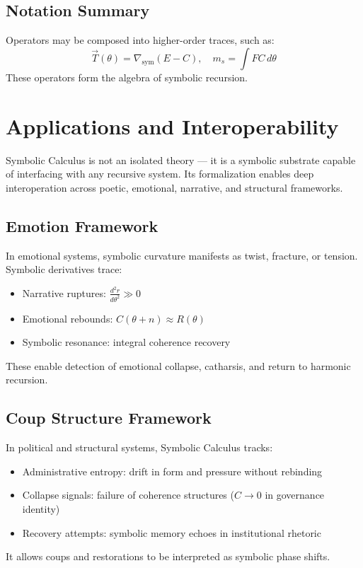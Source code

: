 \documentclass[12pt]{article}
\begin{document}
\subsection*{Notation Summary}
Operators may be composed into higher-order traces, such as:
\[ \vec{T}(\theta) = \nabla_{\text{sym}} (E - C), \quad m_s = \int F C \, d\theta \]
These operators form the algebra of symbolic recursion.

\section{Applications and Interoperability}

Symbolic Calculus is not an isolated theory — it is a symbolic substrate capable of interfacing with any recursive system. Its formalization enables deep interoperation across poetic, emotional, narrative, and structural frameworks.

\subsection*{Emotion Framework}
In emotional systems, symbolic curvature manifests as twist, fracture, or tension. Symbolic derivatives trace:
\begin{itemize}
  \item Narrative ruptures: $\frac{d^2r}{d\theta^2} \gg 0$
  \item Emotional rebounds: $C(\theta + n) \approx R(\theta)$
  \item Symbolic resonance: integral coherence recovery
\end{itemize}
These enable detection of emotional collapse, catharsis, and return to harmonic recursion.

\subsection*{Coup Structure Framework}
In political and structural systems, Symbolic Calculus tracks:
\begin{itemize}
  \item Administrative entropy: drift in form and pressure without rebinding
  \item Collapse signals: failure of coherence structures ($C \to 0$ in governance identity)
  \item Recovery attempts: symbolic memory echoes in institutional rhetoric
\end{itemize}
It allows coups and restorations to be interpreted as symbolic phase shifts.
\end{document}
